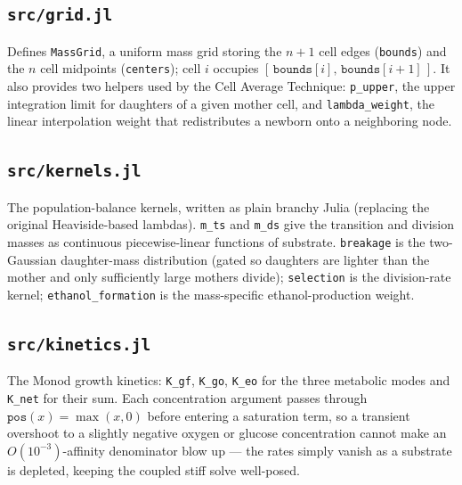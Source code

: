 \documentclass[11pt,a4paper]{article}
\begin{document}


\subsection{\texttt{src/grid.jl}}
Defines \texttt{MassGrid}, a uniform mass grid storing the $n+1$ cell edges (\texttt{bounds}) and the
$n$ cell midpoints (\texttt{centers}); cell $i$ occupies $[\,\texttt{bounds}[i],\,\texttt{bounds}[i{+}1]\,]$.
It also provides two helpers used by the Cell Average Technique: \texttt{p\_upper}, the upper integration
limit for daughters of a given mother cell, and \texttt{lambda\_weight}, the linear interpolation weight
that redistributes a newborn onto a neighboring node.



\subsection{\texttt{src/kernels.jl}}
The population-balance kernels, written as plain branchy Julia (replacing the original
Heaviside-based lambdas). \texttt{m\_ts} and \texttt{m\_ds} give the transition and division masses as
continuous piecewise-linear functions of substrate. \texttt{breakage} is the two-Gaussian daughter-mass
distribution (gated so daughters are lighter than the mother and only sufficiently large mothers divide);
\texttt{selection} is the division-rate kernel; \texttt{ethanol\_formation} is the mass-specific
ethanol-production weight.



\subsection{\texttt{src/kinetics.jl}}
The Monod growth kinetics: \texttt{K\_gf}, \texttt{K\_go}, \texttt{K\_eo} for the three metabolic modes
and \texttt{K\_net} for their sum. Each concentration argument passes through $\texttt{pos}(x)=\max(x,0)$
before entering a saturation term, so a transient overshoot to a slightly negative oxygen or glucose
concentration cannot make an $O(10^{-3})$-affinity denominator blow up --- the rates simply vanish as a
substrate is depleted, keeping the coupled stiff solve well-posed.


\end{document}
